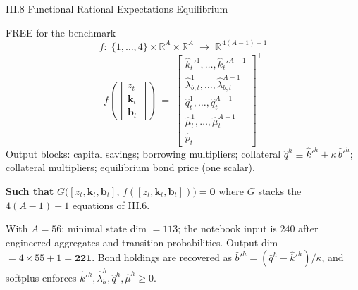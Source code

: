 \documentclass[aspectratio=169,11pt]{beamer}
\newcommand{\R}{\mathbb{R}}
\begin{document}
\begin{frame}{III.8 Functional Rational Expectations Equilibrium}
\small
\begin{exampleblock}{FREE for the benchmark}
\vspace{-3pt}
\[
f:\;\{1,\ldots,4\}\times \R^{A}\times \R^{A} \;\longrightarrow\; \R^{\,4(A-1)+1}
\]
\[
f\!\left(\!\begin{bmatrix} z_t \\ \bm{k}_t \\ \bm{b}_t \end{bmatrix}\!\right)
\;=\;
\begin{bmatrix}
\hat{k}_t'^1,\ldots,\hat{k}_t'^{A-1} \\
\hat\lambda_{b,t}^1,\ldots,\hat\lambda_{b,t}^{A-1} \\
\hat q_{t}^{1},\ldots,\hat q_{t}^{A-1} \\
\hat \mu_{t}^{1},\ldots,\hat \mu_{t}^{A-1} \\
\hat p_t
\end{bmatrix}^{\!\top}
\]
{\footnotesize Output blocks: capital savings; borrowing multipliers; collateral $\hat q^h \equiv \hat k'^h + \kappa\,\hat b'^h$; collateral multipliers; equilibrium bond price (one scalar).}
\vspace{-3pt}\end{exampleblock}

\textbf{Such that} $G\bigl([z_t, \bm{k}_t, \bm{b}_t],\,f([z_t, \bm{k}_t, \bm{b}_t])\bigr) = \bm{0}$ where $G$ stacks the $4(A-1)+1$ equations of III.6.

\vspace{0.3em}
{\footnotesize With $A = 56$: minimal state dim $=113$; the notebook input is $240$ after engineered aggregates and transition probabilities.  Output dim $=4\times55+1=\bm{221}$.  Bond holdings are recovered as $\hat b'^h=(\hat q^h-\hat k'^h)/\kappa$, and softplus enforces $\hat k'^h,\hat\lambda_b^h,\hat q^h,\hat\mu^h\ge0$.}
\end{frame}
\end{document}
